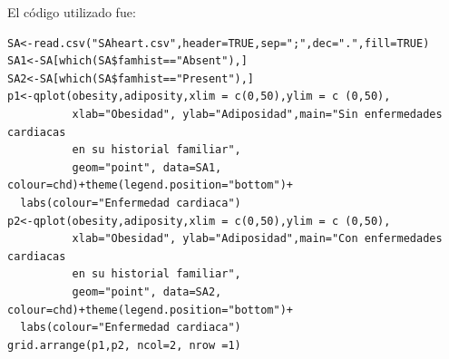 \documentclass[11pt,a4paper]{article}
\begin{document}
\begin{itemize}
El código utilizado fue:
\begin{verbatim}
SA<-read.csv("SAheart.csv",header=TRUE,sep=";",dec=".",fill=TRUE)
SA1<-SA[which(SA$famhist=="Absent"),]
SA2<-SA[which(SA$famhist=="Present"),]
p1<-qplot(obesity,adiposity,xlim = c(0,50),ylim = c (0,50),
          xlab="Obesidad", ylab="Adiposidad",main="Sin enfermedades cardiacas
          en su historial familiar",
          geom="point", data=SA1, colour=chd)+theme(legend.position="bottom")+
  labs(colour="Enfermedad cardiaca")
p2<-qplot(obesity,adiposity,xlim = c(0,50),ylim = c (0,50),
          xlab="Obesidad", ylab="Adiposidad",main="Con enfermedades cardiacas
          en su historial familiar",
          geom="point", data=SA2, colour=chd)+theme(legend.position="bottom")+
  labs(colour="Enfermedad cardiaca")
grid.arrange(p1,p2, ncol=2, nrow =1)
\end{verbatim}


\end{itemize}
\end{document}

